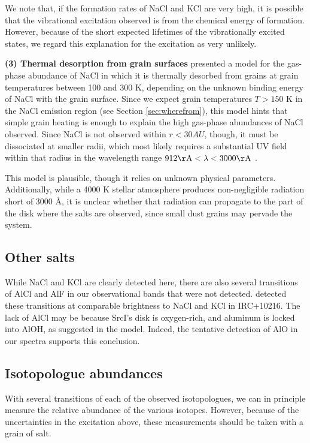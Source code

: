 \documentclass[twocolumn]{aastex62}
\newcommand{\sourcei}{SrcI\xspace}
\newcommand{\rlp}[1]{\textcolor{red!65!black}{\textbf{[RLP: #1]}}}
\newcommand{\ag}[1]{\textcolor{red!65!black}{\textbf{[AG: #1]}}}
\begin{document}
We note that, if the formation rates of NaCl and KCl are very high, it is
possible that the vibrational excitation observed is from the chemical energy
of formation.  However, because of the short expected lifetimes of the
vibrationally excited states, we regard this explanation for the excitation as
very unlikely.


\textbf{(3) Thermal desorption from grain surfaces}
\citet{Decin2016a} presented a model for the gas-phase abundance of
NaCl in which it is thermally desorbed from grains at grain temperatures
between 100 and 300 K, depending on the unknown binding energy of NaCl with
the grain surface.  Since we expect grain temperatures $T>150$ K in the
NaCl emission region (see Section \ref{sec:wherefrom}), this model hints
that simple grain heating is enough to explain the high gas-phase abundances
of NaCl observed.  Since NaCl is not observed within $r<30 AU$, though,
it must be dissociated at smaller radii, which most likely requires
a substantial UV field within that radius in the wavelength range
$912 \mathrm{\AA} < \lambda < 3000 \mathrm{\AA}$ \citep{Silver1986a}.

This model is plausible, though it relies on unknown physical parameters.
Additionally, while a 4000 K stellar atmosphere \citep{Testi2010a} produces
non-negligible radiation short of 3000 \AA, it is unclear whether that
radiation can propagate to the part of the disk where the salts are observed,
since small dust grains may pervade the system.


\subsection{Other salts}
While NaCl and KCl are clearly detected here, there are also several
transitions of AlCl and AlF in our observational bands that were not detected.
\citet{Cernicharo1987a} detected these transitions at comparable brightness to
NaCl and KCl in IRC+10216.  The lack of AlCl may be because \sourcei's disk is
oxygen-rich, and aluminum is locked into AlOH, as suggested in the
\citet{Cherchneff2012a} model.  Indeed, the tentative detection of AlO
in our spectra supports this conclusion.



\subsection{Isotopologue abundances}
With several transitions of each of the observed isotopologues, we can in
principle measure the relative abundance of the various isotopes.  However,
because of the uncertainties in the excitation above, these measurements should
be taken with a grain of salt.
\end{document}
